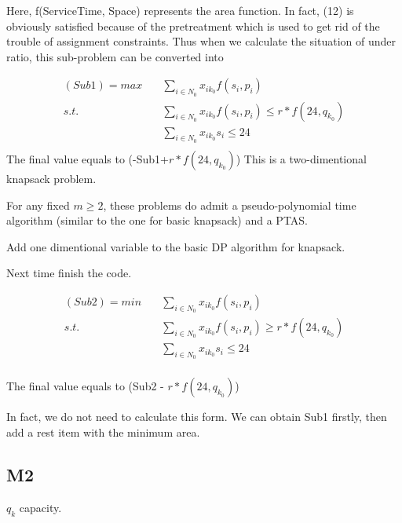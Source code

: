 Here, f(ServiceTime, Space) represents the area function.
In fact, (12) is obviously satisfied because of the pretreatment which is used to get rid of the trouble of assignment constraints.
Thus when we calculate the situation of under ratio, this sub-problem can be converted into

$$
\begin{aligned}
(Sub1) = max \quad & \sum_{i\in N_0}{x_{ik_0} f(s_i,p_i)} \\
s.t. \quad  & \sum_{i\in N_0} x_{ik_0} f(s_i,p_i) \leq r*f(24, q_{k_0}) \\
& \sum_{i\in N_0} x_{ik_0} s_i \leq 24 \\
\end{aligned}$$
The final value equals to (-Sub1+$r*f(24, q_{k_0})$)
This is a two-dimentional knapsack problem.

For any fixed $m\geq 2$, these problems do admit a pseudo-polynomial time algorithm (similar to the one for basic knapsack) and a PTAS.

Add one dimentional variable to the basic DP algorithm for knapsack.

Next time finish the code.

$$
\begin{aligned}
(Sub2) = min \quad & \sum_{i\in N_0}{x_{ik_0} f(s_i,p_i)} \\
s.t. \quad  & \sum_{i\in N_0} x_{ik_0} f(s_i,p_i) \geq r*f(24, q_{k_0}) \\
& \sum_{i\in N_0} x_{ik_0} s_i \leq 24 \\
\end{aligned}$$

The final value equals to (Sub2 - $r*f(24, q_{k_0})$)

In fact, we do not need to calculate this form.
We can obtain Sub1 firstly, then add a rest item with the minimum area.




\subsection{M2}
$q_k$ capacity. 

